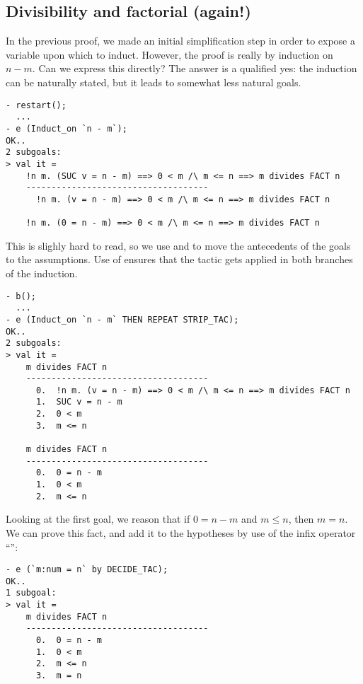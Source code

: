 \subsection{Divisibility and factorial (again!)}

In the previous proof, we made an initial simplification step in order
to expose a variable upon which to induct. However, the proof is
really by induction on $n - m$. Can we express this directly? The
answer is a qualified yes: the induction can be naturally stated, but
it leads to somewhat less natural goals.
\begin{session}\begin{verbatim}
- restart();
  ...
- e (Induct_on `n - m`);
OK..
2 subgoals:
> val it =
    !n m. (SUC v = n - m) ==> 0 < m /\ m <= n ==> m divides FACT n
    ------------------------------------
      !n m. (v = n - m) ==> 0 < m /\ m <= n ==> m divides FACT n

    !n m. (0 = n - m) ==> 0 < m /\ m <= n ==> m divides FACT n
\end{verbatim}\end{session}
    This is slighly hard to read, so we use  and
     to move the antecedents of the goals to the
    assumptions. Use of  ensures that the tactic gets applied
    in both branches of the induction.
\begin{session}\begin{verbatim}
- b();
  ...
- e (Induct_on `n - m` THEN REPEAT STRIP_TAC);
OK..
2 subgoals:
> val it =
    m divides FACT n
    ------------------------------------
      0.  !n m. (v = n - m) ==> 0 < m /\ m <= n ==> m divides FACT n
      1.  SUC v = n - m
      2.  0 < m
      3.  m <= n

    m divides FACT n
    ------------------------------------
      0.  0 = n - m
      1.  0 < m
      2.  m <= n
\end{verbatim}\end{session}
Looking at the first goal, we reason that if $0 = n - m$ and $m
\leq n$, then $m = n$. We can prove this fact, and add it to the
hypotheses by use of the infix operator ``'':
\begin{session}\begin{verbatim}
- e (`m:num = n` by DECIDE_TAC);
OK..
1 subgoal:
> val it =
    m divides FACT n
    ------------------------------------
      0.  0 = n - m
      1.  0 < m
      2.  m <= n
      3.  m = n
\end{verbatim}\end{session}

